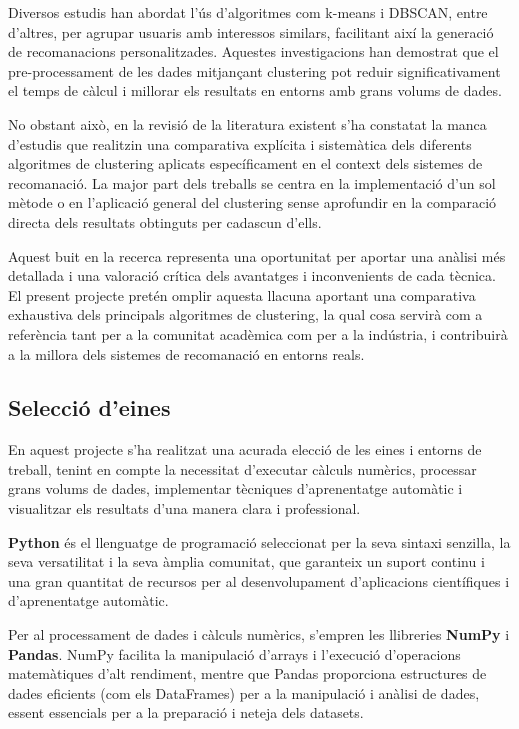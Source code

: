 \documentclass[a4paper,12pt]{report}
\begin{document}
Diversos estudis han abordat l'ús d'algoritmes com k-means i DBSCAN, entre d'altres, per agrupar usuaris amb interessos similars, facilitant així la generació de recomanacions personalitzades.
Aquestes investigacions han demostrat que el pre-processament de les dades mitjançant clustering pot reduir significativament el temps de càlcul i millorar els resultats en entorns amb grans volums de dades.

No obstant això, en la revisió de la literatura existent s'ha constatat la manca d'estudis que realitzin una comparativa explícita i sistemàtica dels diferents algoritmes de clustering aplicats específicament en el context dels sistemes de recomanació.
La major part dels treballs se centra en la implementació d'un sol mètode o en l'aplicació general del clustering sense aprofundir en la comparació directa dels resultats obtinguts per cadascun d'ells.

Aquest buit en la recerca representa una oportunitat per aportar una anàlisi més detallada i una valoració crítica dels avantatges i inconvenients de cada tècnica.
El present projecte pretén omplir aquesta llacuna aportant una comparativa exhaustiva dels principals algoritmes de clustering, la qual cosa servirà com a referència tant per a la comunitat acadèmica com per a la indústria, i contribuirà a la millora dels sistemes de recomanació en entorns reals.

\subsection{Selecció d'eines}

En aquest projecte s'ha realitzat una acurada elecció de les eines i entorns de treball, tenint en compte la necessitat d'executar càlculs numèrics, processar grans volums de dades, implementar tècniques d'aprenentatge automàtic i visualitzar els resultats d'una manera clara i professional.

\textbf{Python} és el llenguatge de programació seleccionat per la seva sintaxi senzilla, la seva versatilitat i la seva àmplia comunitat, que garanteix un suport continu i una gran quantitat de recursos per al desenvolupament d'aplicacions científiques i d'aprenentatge automàtic.

Per al processament de dades i càlculs numèrics, s'empren les llibreries \textbf{NumPy} i \textbf{Pandas}. NumPy facilita la manipulació d'arrays i l'execució d'operacions matemàtiques d'alt rendiment, mentre que Pandas proporciona estructures de dades eficients (com els DataFrames) per a la manipulació i anàlisi de dades, essent essencials per a la preparació i neteja dels datasets.
\end{document}
